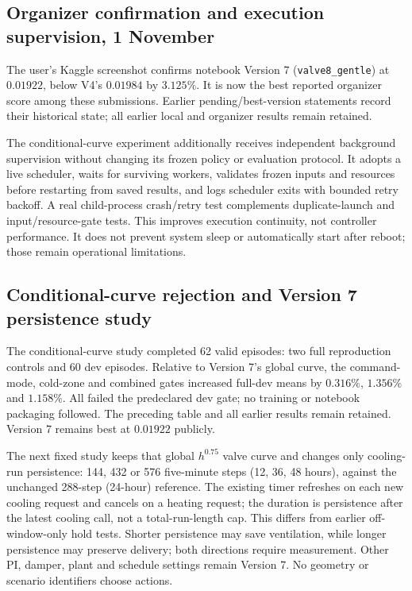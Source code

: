 

\subsection{Organizer confirmation and execution supervision, 1 November}
The user's Kaggle screenshot confirms notebook Version 7
(\texttt{valve8\_gentle}) at $0.01922$, below V4's $0.01984$ by $3.125\%$.
It is now the best reported organizer score among these submissions. Earlier
pending/best-version statements record their historical state; all earlier
local and organizer results remain retained.

The conditional-curve experiment additionally receives independent background
supervision without changing its frozen policy or evaluation protocol. It
adopts a live scheduler, waits for surviving workers, validates frozen inputs
and resources before restarting from saved results, and logs scheduler exits
with bounded retry backoff. A real child-process crash/retry test complements
duplicate-launch and input/resource-gate tests. This improves execution
continuity, not controller performance. It does not prevent system sleep or
automatically start after reboot; those remain operational limitations.

\subsection{Conditional-curve rejection and Version 7 persistence study}
The conditional-curve study completed 62 valid episodes: two full reproduction
controls and 60 dev episodes. Relative to Version 7's global curve, the
command-mode, cold-zone and combined gates increased full-dev means by
$0.316\%$, $1.356\%$ and $1.158\%$. All failed the predeclared dev gate;
no training or notebook packaging followed. The preceding table and all
earlier results remain retained. Version 7 remains best at $0.01922$ publicly.

The next fixed study keeps that global $h^{0.75}$ valve curve and changes only
cooling-run persistence: 144, 432 or 576 five-minute steps (12, 36, 48 hours),
against the unchanged 288-step (24-hour) reference. The existing timer refreshes
on each new cooling request and cancels on a heating request; the duration
is persistence after the latest cooling call, not a total-run-length cap.
This differs from earlier off-window-only hold tests. Shorter persistence
may save ventilation, while longer persistence may preserve delivery;
both directions require measurement. Other PI, damper, plant and schedule
settings remain Version 7. No geometry or scenario identifiers choose actions.

